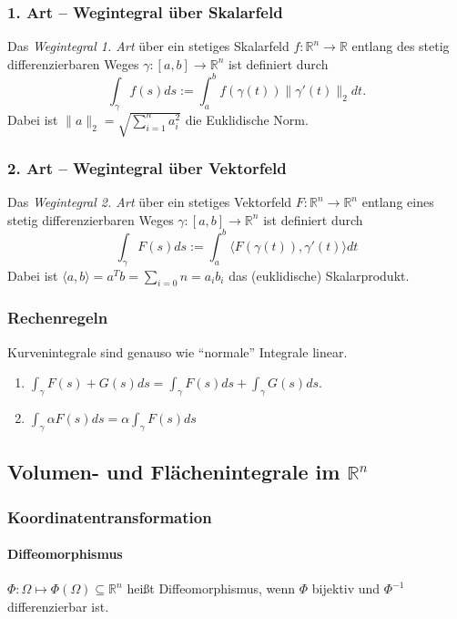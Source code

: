 \documentclass[a4paper, 9pt, DIV=24]{scrartcl}
\newcommand{\R}{\mathbb{R}}
\begin{document}
\subsubsection{1. Art -- Wegintegral über Skalarfeld}
Das \emph{Wegintegral 1. Art} über ein stetiges Skalarfeld $f: \R^n\rightarrow\R$ entlang des stetig differenzierbaren Weges $\gamma: [a,b]\rightarrow\R^n$
ist definiert durch
\[ \int_\gamma f(s)ds := \int_a^b f(\gamma(t))\|\gamma'(t)\|_2dt. \]
Dabei ist $\|a\|_2 = \sqrt{\sum_{i=1}^n a_i^2}$ die Euklidische Norm.

\subsubsection{2. Art -- Wegintegral über Vektorfeld}
Das \emph{Wegintegral 2. Art} über ein stetiges Vektorfeld $F: \R^n\rightarrow\R^n$ entlang eines stetig differenzierbaren Weges $\gamma: [a,b]\rightarrow\R^n$
ist definiert durch
\[ \int_\gamma F(s)ds := \int_a^b\langle F(\gamma(t)), \gamma'(t) \rangle dt\]
Dabei ist $\langle a,b \rangle = a^Tb = \sum_{i=0}{n} = a_ib_i$ das (euklidische) Skalarprodukt.

\subsubsection{Rechenregeln}
Kurvenintegrale sind genauso wie ``normale'' Integrale linear.
\begin{enumerate}[label={(}\arabic*{)}]
 \item $\int_\gamma F(s) + G(s)ds = \int_\gamma F(s)ds + \int_\gamma G(s)ds$.
 \item $\int_\gamma \alpha F(s)ds = \alpha\int_\gamma F(s)ds$
\end{enumerate}

\subsection{Volumen- und Flächenintegrale im $\R^n$}

\subsubsection{Koordinatentransformation}
\paragraph{Diffeomorphismus}
$\Phi: \Omega \mapsto \Phi(\Omega) \subseteq \R^n$ heißt Diffeomorphismus, wenn $\Phi$ bijektiv und $\Phi^{-1}$ differenzierbar ist.
\end{document}
